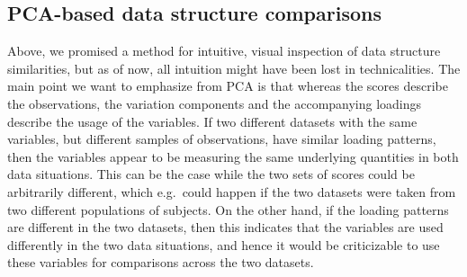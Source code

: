 \documentclass[titlepage,11pt,twoside]{article}
\begin{document}
\subsection{PCA-based data structure comparisons}
Above, we promised a method for intuitive, visual inspection of data structure similarities, but as of now, all intuition might have been lost in technicalities. The main point we want to emphasize from PCA is that whereas the scores describe the observations, the variation components and the accompanying loadings describe the usage of the variables. If two different datasets with the same variables, but different samples of observations, have similar loading patterns, then the variables appear to be measuring the same underlying quantities in both data situations. This can be the case while the two sets of scores could be arbitrarily different, which e.g.\ could happen if the two datasets were taken from two different populations of subjects. On the other hand, if the loading patterns are different in the two datasets, then this indicates that the variables are used differently in the two data situations, and hence it would be criticizable to use these variables for comparisons across the two datasets.


\end{document}
